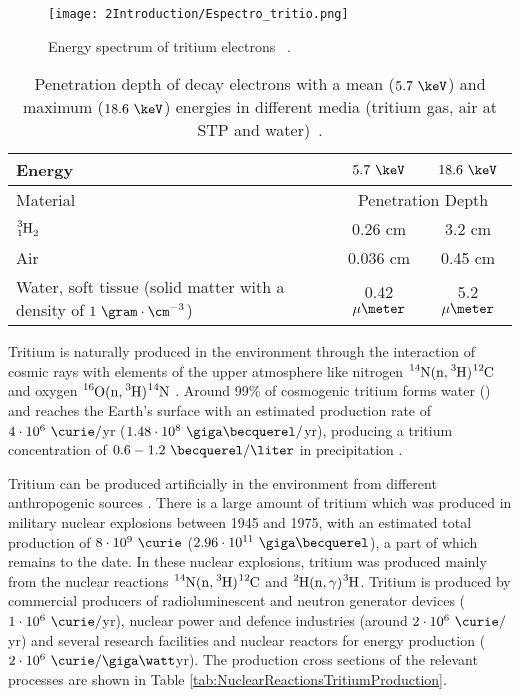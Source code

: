 \begin{figure}[h]
\texttt{[image: 2Introduction/Espectro\_tritio.png]}
\centering
\caption{Energy spectrum of tritium electrons ~\cite{TritiumEspectrum}.\label{fig:TritiumDecaySpectrum}}
\end{figure}

\begin{table}[h]
\centering{}%
\begin{tabular}{lcc}
\toprule 
Energy & $5.7~\keV$ & $18.6~\keV$ \tabularnewline
\midrule
Material & \multicolumn{2}{c}{Penetration Depth} \tabularnewline
\midrule
\midrule 
$\ce{\ce{^{3}_{1}H_2}}$ & 0.26 cm & 3.2 cm \tabularnewline
Air & 0.036 cm & 0.45 cm \tabularnewline
\parbox{10em}{ Water, soft tissue\\  (solid matter with a \\  density of $1~\gram\cdot\cm^{-3}$)} & 0.42 $\mu\meter$ & 5.2 $\mu\meter$ \tabularnewline
\bottomrule
\end{tabular}
\caption{Penetration depth of decay electrons with a mean ($5.7~\keV$) and maximum ($18.6~\keV$) energies in different media (tritium gas, air at STP and water)~\cite{MeanFreePathDocument}.}
\label{tab:MeanFreePathTritium}
\end{table} 

Tritium is naturally produced in the environment through the interaction of cosmic rays with elements of the upper atmosphere like nitrogen $\ce{^{14}N}(\ce{n},\ce{^{3}H})\ce{^{12}C}$ \cite{TritiumHandling} and oxygen $\ce{^{16}O}(\ce{n},\ce{^{3}H})\ce{^{14}N}$ \cite{OxigenTritium}. Around 99\% of cosmogenic tritium forms water () and reaches the Earth's surface with an estimated production rate of $4\cdot 10^6 ~\curie/$yr ($1.48 \cdot 10^8 ~\giga\becquerel/$yr), producing a tritium concentration of $0.6-1.2~\becquerel/\liter$ in precipitation \cite{CommonEmissionTritium, TritiumHandling}. 

Tritium can be produced artificially in the environment from different anthropogenic sources \cite{CommonEmissionTritium, TritiumHandling}. There is a large amount of tritium which was produced in military nuclear explosions between 1945 and 1975, with an estimated total production of $8 \cdot 10^9~\curie$ ($2.96 \cdot 10^{11}~\giga\becquerel$), a part of which remains to the date. In these nuclear explosions, tritium was produced mainly from the nuclear reactions $\ce{^{14}N}(\ce{n},\ce{^{3}H})\ce{^{12}C}$ and $\ce{^{2}H}(\ce{n},\gamma)\ce{^{3}H}$. Tritium is produced by commercial producers of radioluminescent and neutron generator devices ($1 \cdot 10^6~\curie/$yr), nuclear power and defence industries (around $2 \cdot 10^6~\curie/$yr) and several research facilities and nuclear reactors for energy production ($2 \cdot 10^6~\curie/\giga\watt$yr). The production cross sections of the relevant processes are shown in Table \ref{tab:NuclearReactionsTritiumProduction}.

